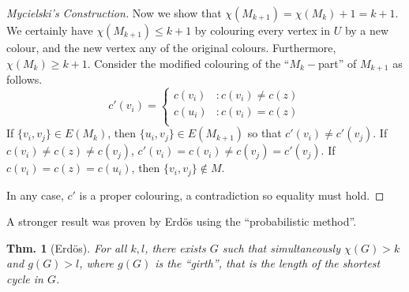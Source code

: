 \documentclass[12pt, a4paper]{book}
\newtheorem{theorem}{Thm.}[section]
\theoremstyle{nonumberplain}
\newtheorem{proof}{Proof}
\begin{document}
\begin{proof}[Mycielski's Construction]
    Now we show that $\chi(M_{k+1})=\chi(M_k)+1=k+1$.
    We certainly have $\chi(M_{k+1})\leq k+1$ by colouring every vertex in $U$ by a new colour, and the new vertex any of the original colours.
    Furthermore, $\chi(M_k)\geq k+1$.
    Consider the modified colouring of the ``$M_k-$part'' of $M_{k+1}$ as follows.
    \[c'(v_i) =
        \begin{cases}
            c(v_i)&:c(v_i)\neq c(z)\\
            c(u_i)&:c(v_i)= c(z)\\
        \end{cases}
    \]
    If $\{v_i,v_j\}\in E(M_k)$, then $\{u_i,v_j\}\in E(M_{k+1})$ so that $c'(v_i)\neq c'(v_j)$.
    If $c(v_i)\neq c(z)\neq c(v_j)$, $c'(v_i)=c(v_i)\neq c(v_j)=c'(v_j)$.
    If $c(v_i)=c(z)=c(u_i)$, then $\{v_i,v_j\}\notin M$.

    In any case, $c'$ is a proper colouring, a contradiction so equality must hold.
\end{proof}
A stronger result was proven by Erd\"os using the ``probabilistic method''.
\begin{theorem}[Erd\"os]
    For all $k,l$, there exists $G$ such that simultaneously $\chi(G)>k$ and $g(G)>l$, where $g(G)$ is the ``girth'', that is the length of the shortest cycle in $G$.
\end{theorem}
\end{document}
